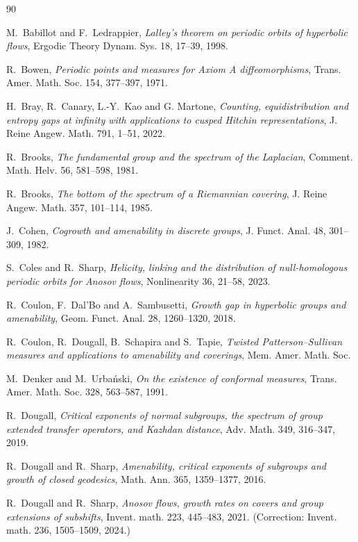 \documentclass[11pt,letterpaper]{amsart}
\theoremstyle{definition}
\numberwithin{equation}{section}
\numberwithin{theorem}{section}
\begin{document}
\begin{thebibliography}{90}

M.~Babillot and F.~Ledrappier,
\emph{Lalley’s theorem on periodic orbits of hyperbolic flows}, 
Ergodic Theory Dynam. Sys. 18, 17--39, 1998.

R.~Bowen,
\emph{Periodic points and measures for Axiom A diffeomorphisms},
Trans. Amer. Math. Soc. 154, 377--397, 1971.

H.~Bray, R.~Canary, L.-Y.~Kao and G. Martone,
\emph{Counting, equidistribution and entropy gaps at infinity with applications to
cusped Hitchin representations},
J. Reine Angew. Math. 791, 1--51, 2022.

R.~Brooks,
\emph{The fundamental group and the spectrum of the Laplacian},
Comment. Math. Helv. 56, 581--598, 1981.

R.~Brooks,
\emph{The bottom of the spectrum of a Riemannian covering},
J. Reine Angew. Math. 357, 101--114, 1985.

J.~Cohen,
\emph{Cogrowth and amenability in discrete groups},
J. Funct. Anal. 48, 301--309, 1982.

S.~Coles and R.~Sharp,
\emph{Helicity, linking and the distribution of null-homologous periodic orbits for Anosov flows},
 Nonlinearity 36, 21--58, 2023.

R.~Coulon, F.~Dal'Bo and A.~Sambusetti,
\emph{Growth gap in hyperbolic groups and amenability},
Geom. Funct. Anal. 28, 1260--1320, 2018.

R.~Coulon, R.~Dougall, B.~Schapira and S.~Tapie,
\emph{Twisted Patterson--Sullivan measures and applications to amenability and coverings},
Mem. Amer. Math. Soc. 

M.~Denker and M.~Urba\'nski,
\emph{On the existence of conformal measures},
Trans. Amer. Math. Soc. 328, 563--587, 1991.

R.~Dougall,
\emph{Critical exponents of normal subgroups, the spectrum of group extended transfer operators, and Kazhdan distance},
Adv. Math. 349, 316--347, 2019.

R.~Dougall and R.~Sharp,
\emph{Amenability, critical exponents of subgroups and growth of closed geodesics},
Math. Ann. 365, 1359--1377, 2016.

R.~Dougall and R.~Sharp,
\emph{Anosov flows, growth rates on covers and group extensions of subshifts},
Invent. math. 223, 445--483, 2021.
(Correction: Invent. math. 236, 1505--1509, 2024.)


\end{thebibliography}
\end{document}
